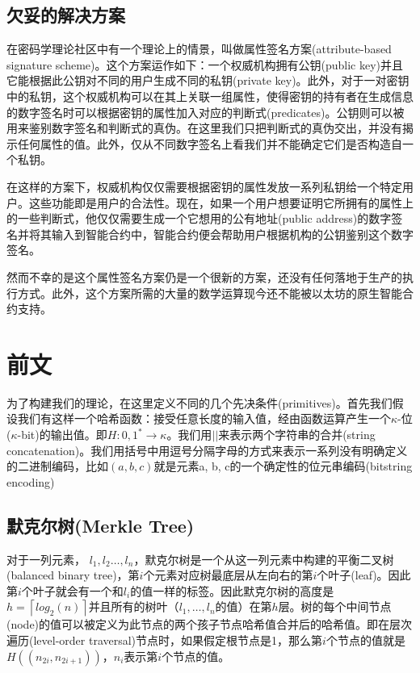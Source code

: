 \documentclass[UTF8]{ctexart}
\def\lc{\left\lceil}
\def\rc{\right\rceil}
\begin{document}
\subsection{欠妥的解决方案}
在密码学理论社区中有一个理论上的情景，叫做属性签名方案(attribute-based signature scheme)。这个方案运作如下：一个权威机构拥有公钥(public key)并且它能根据此公钥对不同的用户生成不同的私钥(private key)。此外，对于一对密钥中的私钥，这个权威机构可以在其上关联一组属性，使得密钥的持有者在生成信息的数字签名时可以根据密钥的属性加入对应的判断式(predicates)。公钥则可以被用来鉴别数字签名和判断式的真伪。在这里我们只把判断式的真伪交出，并没有揭示任何属性的值。此外，仅从不同数字签名上看我们并不能确定它们是否构造自一个私钥。

在这样的方案下，权威机构仅仅需要根据密钥的属性发放一系列私钥给一个特定用户。这些功能即是用户的合法性。现在，如果一个用户想要证明它所拥有的属性上的一些判断式，他仅仅需要生成一个它想用的公有地址(public address)的数字签名并将其输入到智能合约中，智能合约便会帮助用户根据机构的公钥鉴别这个数字签名。

然而不幸的是这个属性签名方案仍是一个很新的方案，还没有任何落地于生产的执行方式。此外，这个方案所需的大量的数学运算现今还不能被以太坊的原生智能合约支持。

\section{前文} \label{sec:firstpage}

为了构建我们的理论，在这里定义不同的几个先决条件(primitives)。首先我们假设我们有这样一个哈希函数：接受任意长度的输入值，经由函数运算产生一个$\kappa$-位($\kappa$-bit)的输出值。即$H: {0, 1}^* \to \kappa$。我们用$||$来表示两个字符串的合并(string concatenation)。我们用括号中用逗号分隔字母的方式来表示一系列没有明确定义的二进制编码，比如$(a, b, c)$就是元素a, b, c的一个确定性的位元串编码(bitstring encoding)

\subsection{默克尔树(Merkle Tree)}
对于一列元素， $l_1, l_2 \dots, l_n$，默克尔树是一个从这一列元素中构建的平衡二叉树(balanced binary tree)，第$i$个元素对应树最底层从左向右的第$i$个叶子(leaf)。因此第$i$个叶子就会有一个和$l_i$的值一样的标签。因此默克尔树的高度是$h = \lc log_2(n)\rc$并且所有的树叶（$l_1, \dots, l_n$的值）在第$h$层。树的每个中间节点(node)的值可以被定义为此节点的两个孩子节点哈希值合并后的哈希值。即在层次遍历(level-order traversal)节点时，如果假定根节点是1，那么第$i$个节点的值就是$H((n_{2i}, n_{2i + 1}))$，$n_i$表示第$i$个节点的值。
\end{document}
